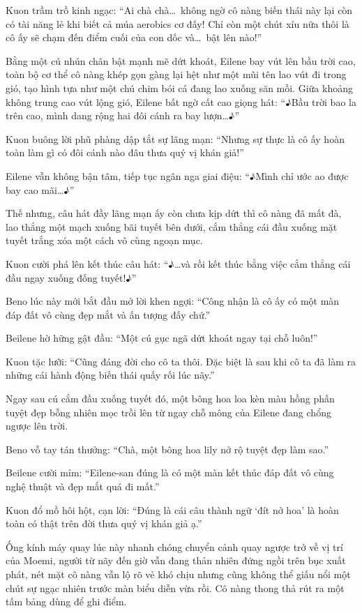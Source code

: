 \documentclass[../main.tex]{subfiles}
\begin{document}
Kuon trầm trồ kinh ngạc: ``Ai chà chà\dots\ không ngờ cô nàng biến thái này lại còn có tài năng lẻ khi biết cả múa aerobics cơ đấy! Chỉ còn một chút xíu nữa thôi là cô ấy sẽ chạm đến điểm cuối của con dốc và\dots\ bật lên nào!''

Bằng một cú nhún chân bật mạnh mẽ dứt khoát, Eilene bay vút lên bầu trời cao, toàn bộ cơ thể cô nàng khép gọn gàng lại hệt như một mũi tên lao vút đi trong gió, tạo hình tựa như một chú chim bói cá đang lao xuống săn mồi. Giữa khoảng không trung cao vút lộng gió, Eilene bất ngờ cất cao giọng hát: ``♪Bầu trời bao la trên cao, mình dang rộng hai đôi cánh ra bay lượn\dots♪''

Kuon buông lời phũ phàng dập tắt sự lãng mạn: ``Nhưng sự thực là cô ấy hoàn toàn làm gì có đôi cánh nào đâu thưa quý vị khán giả!''

Eilene vẫn không bận tâm, tiếp tục ngân nga giai điệu: ``♪Mình chỉ ước ao được bay cao mãi\dots♪''

Thế nhưng, câu hát đầy lãng mạn ấy còn chưa kịp dứt thì cô nàng đã mất đà, lao thẳng một mạch xuống bãi tuyết bên dưới, cắm thẳng cái đầu xuống mặt tuyết trắng xóa một cách vô cùng ngoạn mục.

Kuon cười phá lên kết thúc câu hát: ``♪\dots và rồi kết thúc bằng việc cắm thẳng cái đầu ngay xuống đống tuyết!♪''

Beno lúc này mới bắt đầu mở lời khen ngợi: ``Công nhận là cô ấy có một màn đáp đất vô cùng đẹp mắt và ấn tượng đấy chứ.''

Beilene hờ hững gật đầu: ``Một cú gục ngã dứt khoát ngay tại chỗ luôn!''

Kuon tặc lưỡi: ``Cũng đáng đời cho cô ta thôi. Đặc biệt là sau khi cô ta đã làm ra những cái hành động biến thái quấy rối lúc nãy.''

Ngay sau cú cắm đầu xuống tuyết đó, một bông hoa loa kèn màu hồng phấn tuyệt đẹp bỗng nhiên mọc trồi lên từ ngay chỗ mông của Eilene đang chổng ngược lên trời.

Beno vỗ tay tán thưởng: ``Chà, một bông hoa lily nở rộ tuyệt đẹp làm sao.''

Beilene cười mỉm: ``Eilene-san đúng là có một màn kết thúc đáp đất vô cùng nghệ thuật và đẹp mắt quá đi mất.''

Kuon đổ mồ hôi hột, cạn lời: ``Đúng là cái câu thành ngữ `đít nở hoa' là hoàn toàn có thật trên đời thưa quý vị khán giả ạ.''

Ống kính máy quay lúc này nhanh chóng chuyển cảnh quay ngược trở về vị trí của Moemi, người từ nãy đến giờ vẫn đang thản nhiên đứng ngồi trên bục xuất phát, nét mặt cô nàng vẫn lộ rõ vẻ khó chịu nhưng cũng không thể giấu nổi một chút sự ngạc nhiên trước màn biểu diễn vừa rồi. Cô nàng thong thả rút ra một tấm bảng dùng để ghi điểm.
\end{document}
